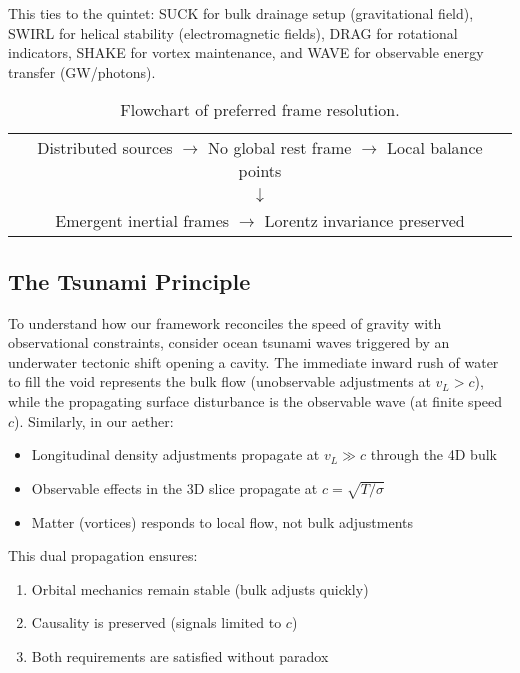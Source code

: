 This ties to the quintet: SUCK for bulk drainage setup (gravitational field), SWIRL for helical stability (electromagnetic fields), DRAG for rotational indicators, SHAKE for vortex maintenance, and WAVE for observable energy transfer (GW/photons).

\begin{table}[h]
\centering
\begin{tabular}{c}
Distributed sources $\to$ No global rest frame $\to$ Local balance points \\
$\downarrow$ \\
Emergent inertial frames $\to$ Lorentz invariance preserved
\end{tabular}
\caption{Flowchart of preferred frame resolution.}
\label{tab:frame-flow}
\end{table}

\medskip

\subsection{The Tsunami Principle}

To understand how our framework reconciles the speed of gravity with observational constraints, consider ocean tsunami waves triggered by an underwater tectonic shift opening a cavity. The immediate inward rush of water to fill the void represents the bulk flow (unobservable adjustments at $v_L > c$), while the propagating surface disturbance is the observable wave (at finite speed $c$). Similarly, in our aether:
\begin{itemize}
\item Longitudinal density adjustments propagate at $v_L \gg c$ through the 4D bulk
\item Observable effects in the 3D slice propagate at $c = \sqrt{T / \sigma}$
\item Matter (vortices) responds to local flow, not bulk adjustments
\end{itemize}

This dual propagation ensures:
\begin{enumerate}
\item Orbital mechanics remain stable (bulk adjusts quickly)
\item Causality is preserved (signals limited to $c$)
\item Both requirements are satisfied without paradox
\end{enumerate}

